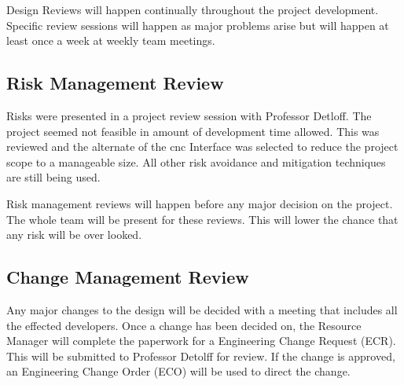 Design Reviews will happen continually throughout the project development. 
Specific review sessions will happen as major problems arise but will happen at least once a week at weekly team meetings.
\subsection{Risk Management Review}
Risks were presented in a project review session with Professor Detloff.
The project seemed not feasible in amount of development time allowed.
This was reviewed and the alternate of the \gls{cnc} Interface was selected to reduce the project scope to a manageable size. 
All other risk avoidance and mitigation techniques are still being used.   

Risk management reviews will happen before any major decision on the project.
The whole team will be present for these reviews. 
This will lower the chance that any risk will be over looked.
\subsection{Change Management Review}
Any major changes to the design will be decided with a meeting that includes all the effected developers.
Once a change has been decided on, the Resource Manager will complete the paperwork for a Engineering Change Request (ECR).
This will be submitted to Professor Detolff for review.
If the change is approved, an Engineering Change Order (ECO) will be used to direct the change.

